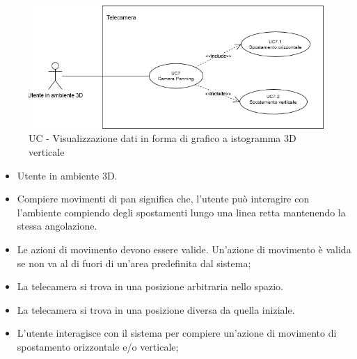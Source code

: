\begin{figure}[h!]
    \centering
    \includegraphics[scale=0.7]{template/images/UC7.png}
    \caption{UC - Visualizzazione dati in forma di grafico a istogramma 3D verticale}
\end{figure}
\UCdsc
    { %
        \begin{itemize}
            \item Utente in ambiente 3D.
        \end{itemize}
    }
    { %
        \begin{itemize}
            \item Compiere movimenti di pan significa che, l'utente può interagire con l'ambiente compiendo degli spostamenti lungo una linea retta mantenendo la stessa angolazione.
        \end{itemize}
    }
    { %
        \begin{itemize}
            \item Le azioni di movimento devono essere valide. Un'azione di movimento è valida se non va al di fuori di un'area predefinita dal sistema;
            \item La telecamera si trova in una posizione arbitraria nello spazio.
        \end{itemize}
    }
    { %
        \begin{itemize}
            \item La telecamera si trova in una posizione diversa da quella iniziale.
        \end{itemize}
    }
    { %
        \begin{itemize}
            \item L'utente interagisce con il sistema per compiere un'azione di movimento di spostamento orizzontale e/o verticale;
        \end{itemize}
    }

